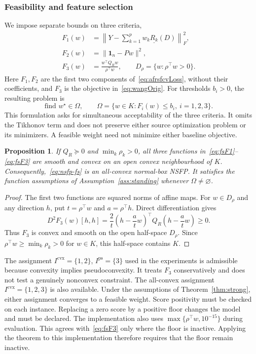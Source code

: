 \documentclass[]{interact}
\theoremstyle{plain}
\newtheorem{proposition}[theorem]{Proposition}
\theoremstyle{definition}
\theoremstyle{remark}
\newcommand{\cvx}{\mathrm{cvx}}
\newcommand{\ps}{\mathrm{ps}}
\begin{document}
\subsubsection{Feasibility and feature selection}\label{ssec:reduction}\label{ssec:selection}
We impose separate bounds on three criteria,
\begin{align}
F_1(w)&=\left\|Y-\sum_{k=1}^{p}w_k\underline{R_k}(D)\right\|_F^2,\label{eq:fsF1}\\
F_2(w)&=\|\mathbf1_n-Pw\|^2,\label{eq:fsF2}\\
F_3(w)&=\frac{w^{\top}Q_Rw}{\rho^{\top}w},\qquad D_\rho=\{w:\rho^{\top}w>0\}.\label{eq:fsF3}
\end{align}
Here $F_1,F_2$ are the first two components of~\eqref{eq:afrsfcvLoss}, without their coefficients, and $F_3$ is the objective in~\eqref{eq:wangOrig}. For thresholds $b_i>0$, the resulting problem is
\begin{equation}\label{eq:nsfp-fs}
\text{find }w^\star\in\Omega,\qquad \Omega=\{w\in K:F_i(w)\le b_i,\ i=1,2,3\}.
\end{equation}
This formulation asks for simultaneous acceptability of the three criteria. It omits the Tikhonov term and does not preserve either source optimization problem or its minimizers. A feasible weight need not minimize either baseline objective.

\begin{proposition}\label{prop:fs-reg}
If $Q_R\succeq0$ and $\min_k\rho_k>0$, all three functions in~\eqref{eq:fsF1}--\eqref{eq:fsF3} are smooth and convex on an open convex neighbourhood of $K$. Consequently,~\eqref{eq:nsfp-fs} is an all-convex normal-box NSFP. It satisfies the function assumptions of Assumption~\ref{ass:standing} whenever $\Omega\ne\varnothing$.
\end{proposition}
\begin{proof}
The first two functions are squared norms of affine maps. For $w\in D_\rho$ and any direction $h$, put $t=\rho^{\top}w$ and $a=\rho^{\top}h$. Direct differentiation gives
\begin{equation}\label{eq:fsF3-curvature}
D^2F_3(w)[h,h]=\frac2t\left(h-\frac atw\right)^{\!\top}Q_R\left(h-\frac atw\right)\ge0.
\end{equation}
Thus $F_3$ is convex and smooth on the open half-space $D_\rho$. Since $\rho^{\top}w\ge\min_k\rho_k>0$ for $w\in K$, this half-space contains $K$.
\end{proof}

The assignment $I^{\cvx}=\{1,2\}$, $I^{\ps}=\{3\}$ used in the experiments is admissible because convexity implies pseudoconvexity. It treats $F_3$ conservatively and does not test a genuinely nonconvex constraint. The all-convex assignment $I^{\cvx}=\{1,2,3\}$ is also available. Under the assumptions of Theorem~\ref{thm:strong}, either assignment converges to a feasible weight. Score positivity must be checked on each instance. Replacing a zero score by a positive floor changes the model and must be declared. The implementation also uses $\max\{\rho^{\top}w,10^{-15}\}$ during evaluation. This agrees with~\eqref{eq:fsF3} only where the floor is inactive. Applying the theorem to this implementation therefore requires that the floor remain inactive.
\end{document}
